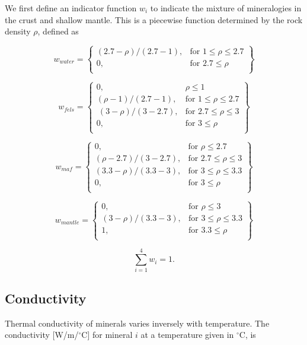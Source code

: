 \documentclass[a4paper,10pt]{article}
\begin{document}
\noindent We first define an indicator function $w_i$ to indicate the mixture of mineralogies in the crust and shallow mantle.  This is a piecewise function determined by the rock density $\rho$, defined as 

  \[
    w_{water} = \left\{\begin{array}{rr}
        (2.7-\rho)/(2.7-1), & \text{for } 1\leq \rho  \leq  2.7\\
        0, & \text{for } 2.7 \leq \rho \\
        \end{array}\right\} 
  \]

  \[
    w_{fels} = \left\{\begin{array}{rr}
        0, & \rho \leq 1 \\
    	(\rho-1)/(2.7-1), & \text{for } 1 \leq \rho \leq2.7\\\
	(3-\rho)/(3-2.7), & \text{for } 2.7\leq \rho  \leq  3\\
        0, & \text{for } 3 \leq \rho \\
        \end{array}\right\} 
  \]
  
    \[
    w_{maf} = \left\{\begin{array}{rr}
    	0, &  \text{for }  \rho  \leq  2.7\\
        (\rho-2.7)/(3-2.7), & \text{for } 2.7\leq \rho  \leq  3\\
        (3.3-\rho)/(3.3-3), & \text{for } 3\leq \rho  \leq  3.3\\
        0, & \text{for } 3 \leq \rho \\
        \end{array}\right\} 
  \]
  
      \[
    w_{mantle} = \left\{\begin{array}{rr}
    	0, &  \text{for }  \rho  \leq  3\\
        (3-\rho)/(3.3-3), & \text{for } 3\leq \rho  \leq  3.3\\
        1, & \text{for } 3.3 \leq \rho \\
        \end{array}\right\}
  \]
 
       \[
    \sum_{i=1}^4 w_i =1.
  \]
  \subsection{Conductivity}
  
  \noindent Thermal conductivity of minerals varies inversely with temperature. The  conductivity [W/m/$^{\circ}$C] for mineral $i$ at a temperature given in $^{\circ}$C, is 
  
\end{document}
